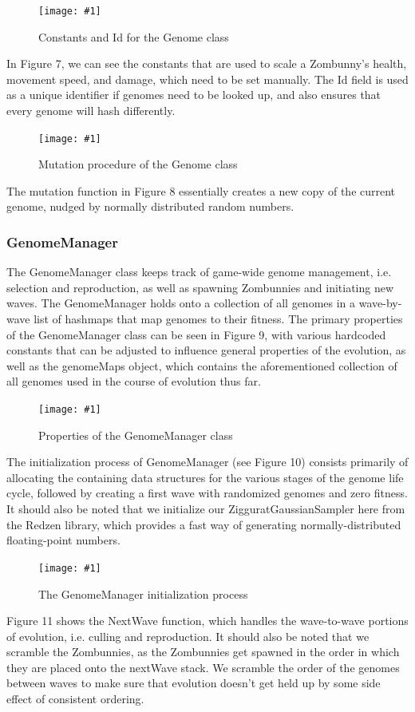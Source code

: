 \documentclass[letterpaper]{article}
\def\imfig#1#2{\begin{figure}[h] \centering \texttt{[image: \#1]} \caption{#2} \end{figure}}
\def\imfigB#1#2{\begin{figure} \centering \texttt{[image: \#1]} \caption{#2} \end{figure}}
\begin{document}
\imfigB{Genome1}{Constants and Id for the Genome class}

In Figure 7, we can see the constants that are used to scale a Zombunny's health, movement speed, and damage, which need to be set manually. The Id field is used as a unique identifier if genomes need to be looked up, and also ensures that every genome will hash differently.

\imfig{Mutation}{Mutation procedure of the Genome class}

The mutation function in Figure 8 essentially creates a new copy of the current genome, nudged by normally distributed random numbers.

\subsubsection{GenomeManager}

The GenomeManager class keeps track of game-wide genome management, i.e. selection and reproduction, as well as spawning Zombunnies and initiating new waves. The GenomeManager holds onto a collection of all genomes in a wave-by-wave list of hashmaps that map genomes to their fitness. The primary properties of the GenomeManager class can be seen in Figure 9, with various hardcoded constants that can be adjusted to influence general properties of the evolution, as well as the genomeMaps object, which contains the aforementioned collection of all genomes used in the course of evolution thus far.

\imfig{GenomeManagerProperties}{Properties of the GenomeManager class}

The initialization process of GenomeManager (see Figure 10) consists primarily of allocating the containing data structures for the various stages of the genome life cycle, followed by creating a first wave with randomized genomes and zero fitness. It should also be noted that we initialize our ZigguratGaussianSampler here from the Redzen library, which provides a fast way of generating normally-distributed floating-point numbers.

\imfig{GenomeManagerInit}{The GenomeManager initialization process}

Figure 11 shows the NextWave function, which handles the wave-to-wave portions of evolution, i.e. culling and reproduction. It should also be noted that we scramble the Zombunnies, as the Zombunnies get spawned in the order in which they are placed onto the nextWave stack. We scramble the order of the genomes between waves to make sure that evolution doesn't get held up by some side effect of consistent ordering.
\end{document}
